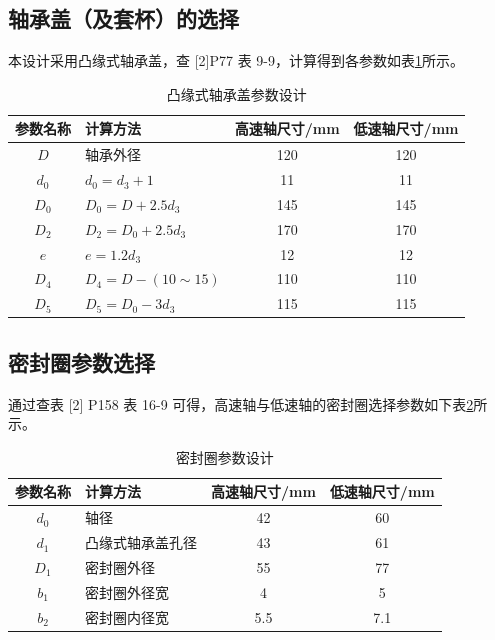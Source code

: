 \documentclass[12pt]{ctexart}
\begin{document}
\subsection{轴承盖（及套杯）的选择}

本设计采用凸缘式轴承盖，查 [2]P77 表 9-9，计算得到各参数如表\ref{table15}所示。

\begin{table}[hbp]
    \centering
    \setlength{\belowcaptionskip}{0.3cm}
    \caption{凸缘式轴承盖参数设计}
    \begin{tabular}{c l c c}
        \toprule
        参数名称 & 计算方法& 高速轴尺寸/mm & 低速轴尺寸/mm\\
        \midrule
        $D$   & 轴承外径     & 120  & 120 \\
        $d_0$ & $d_0=d_3+1$ & 11 & 11\\
        $D_0$ & $D_0=D + 2.5d_3$ & 145  & 145\\
        $D_2$ & $D_2=D_0 + 2.5d_3$ & 170 & 170 \\
        $e$   & $e=1.2d_3$        & 12 & 12  \\
        $D_4$ & $D_4=D-(10\sim 15)$ & 110 & 110 \\
        $D_5$ & $D_5=D_0-3d_3$    &  115 & 115\\
        \bottomrule
    \end{tabular}
    
    \label{table15}
\end{table}

\subsection{密封圈参数选择}

通过查表 [2] P158 表 16-9 可得，高速轴与低速轴的密封圈选择参数如下表\ref{table14}所示。


\begin{table}[hbp]
    
    
    \centering
    \setlength{\belowcaptionskip}{0.3cm}
    \caption{密封圈参数设计}
    \begin{tabular}{c l c c}
        \toprule
        参数名称 & 计算方法& 高速轴尺寸/mm & 低速轴尺寸/mm\\
        \midrule
        $d_0$   & 轴径     & 42  & 60 \\
        $d_1$   & 凸缘式轴承盖孔径 & 43 & 61\\
        $D_1$   & 密封圈外径 &  55 & 77\\
        $b_1$   & 密封圈外径宽 & 4  & 5 \\
        $b_2$   & 密封圈内径宽 & 5.5 & 7.1 \\ 
        \bottomrule
    \end{tabular}
    
    \label{table14}
\end{table}
\end{document}
